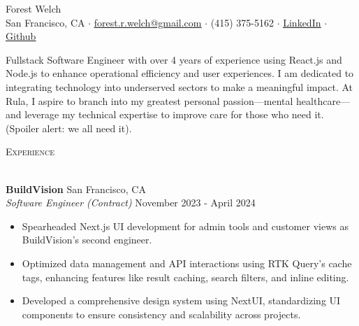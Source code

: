 \documentclass[a4paper]{article}
\newcommand{\header}[1]{
    {\hspace*{-18pt}\vspace*{3pt} \textcolor{deeppurple}{\textsc{#1}}}
    \vspace*{-12pt} \\
    \hspace*{-18pt} \textcolor{deeppurple}{\hrulefill} \\
}
\begin{document}
\vspace{-40pt}

\begin{center}
    {\fontsize{36}{36}\selectfont \textcolor{deeppurple}{Forest Welch}} \\ %
    \vspace{10pt} %
    \small San Francisco, CA $\cdot$ \href{mailto:forest.r.welch@gmail.com}{\underline{forest.r.welch@gmail.com}} $\cdot$ (415) 375-5162 $\cdot$ \href{https://linkedin.com/in/forestrwelch}{\underline{LinkedIn}} $\cdot$ \href{https://github.com/nwelchr}{\underline{Github}}
\end{center}


\begin{center}
    Fullstack Software Engineer with over 4 years of experience using React.js and Node.js to enhance operational efficiency and user experiences. I am dedicated to integrating technology into underserved sectors to make a meaningful impact. At Rula, I aspire to branch into my greatest personal passion—mental healthcare—and leverage my technical expertise to improve care for those who need it. (Spoiler alert: we all need it).
\end{center}

\header{Experience}
\vspace{1mm}

\textbf{BuildVision} \hfill San Francisco, CA\\
\textit{Software Engineer (Contract)} \hfill November 2023 - April 2024\\
\vspace{-1mm}
\begin{itemize} \itemsep .5pt
    \item Spearheaded Next.js UI development for admin tools and customer views as BuildVision's second engineer.
    \item Optimized data management and API interactions using RTK Query's cache tags, enhancing features like result caching, search filters, and inline editing.
    \item Developed a comprehensive design system using NextUI, standardizing UI components to ensure consistency and scalability across projects.
\end{itemize}
\end{document}
